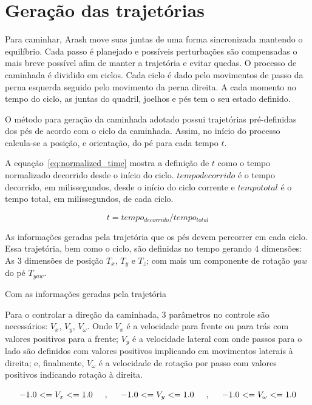 \section{Geração das trajetórias}

Para caminhar, Arash move suas juntas de uma forma sincronizada mantendo o equilíbrio. Cada passo é planejado e possíveis perturbações são compensadas o mais breve possível afim de manter a trajetória e evitar quedas. O processo de caminhada é dividido em ciclos. Cada ciclo é dado pelo movimentos de passo da perna esquerda seguido pelo movimento da perna direita. A cada momento no tempo do ciclo, as juntas do quadril, joelhos e pés tem o seu estado definido.

O método para geração da caminhada adotado possui trajetórias pré-definidas dos pés de acordo com o ciclo da caminhada. Assim, no início do processo calcula-se a posição, e orientação, do pé para cada tempo $t$.

A equação~\ref{eq:normalized_time} mostra a definição de $t$ como o tempo normalizado decorrido desde o início do ciclo. $tempo{decorrido}$ é o tempo decorrido, em milissegundos, desde o início do ciclo corrente e $tempo{total}$ é o tempo total, em milissegundos, de cada ciclo. 

\begin{equation}
t = tempo_{decorrido} / tempo_{total}
\label{eq:normalized_time}
\end{equation}

As informações geradas pela trajetória que os pés devem percorrer em cada ciclo. Essa trajetória, bem como o ciclo, são definidas no tempo gerando 4 dimensões: As 3 dimensões de posição $T_x$, $T_y$ e $T_z$; com mais um componente de rotação \textit{yaw} do pé $T_{yaw}$.

Com as informações geradas pela trajetória

Para o controlar a direção da caminhada, 3 parâmetros no controle são necessários: $V_x$, $V_y$, $V_\omega$. Onde $V_x$ é a velocidade para frente ou para trás com valores positivos para a frente; $V_y$ é a velocidade lateral com onde passos para o lado são definidos com valores positivos implicando em movimentos laterais à direita; e, finalmente, $V_\omega$ é a velocidade de rotação por passo com valores positivos indicando rotação à direita.

\begin{equation}
	-1.0 <= V_x <= 1.0
	\hspace{5mm},\hspace{5mm}
	-1.0 <= V_y <= 1.0
	\hspace{5mm},\hspace{5mm}
	-1.0 <= V_\omega <= 1.0
	\label{eq:velocities_range}
\end{equation}

